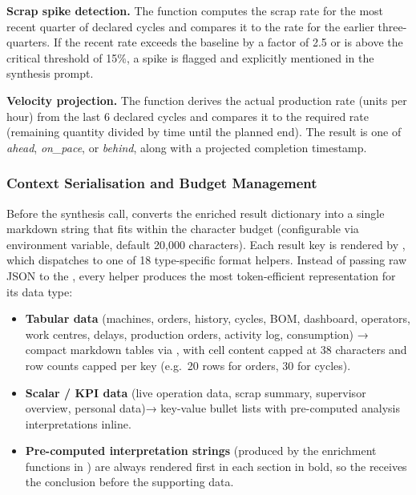 \textbf{Scrap spike detection.} The  function computes
the scrap rate for the most recent quarter of declared cycles and compares it to
the rate for the earlier three-quarters. If the recent rate exceeds the baseline
by a factor of 2.5 or is above the critical threshold of 15\%, a spike is flagged
and explicitly mentioned in the synthesis prompt.

\textbf{Velocity projection.} The  function derives
the actual production rate (units per hour) from the last 6 declared cycles and
compares it to the required rate (remaining quantity divided by time until the
planned end). The result is one of \textit{ahead}, \textit{on\_pace}, or
\textit{behind}, along with a projected completion timestamp.

\subsubsection*{Context Serialisation and Budget Management}
Before the synthesis  call, 
converts the enriched result dictionary into a single markdown string that
fits within the  character budget
(configurable via environment variable, default 20,000 characters).
Each result key is rendered by , which
dispatches to one of 18 type-specific format helpers. Instead of passing
raw JSON to the , every helper produces the most
token-efficient representation for its data type:
\begin{itemize}[noitemsep, topsep=4pt, leftmargin=*]
  \item \textbf{Tabular data} (machines, orders, history, cycles, BOM,
        dashboard, operators, work centres, delays, production orders,
        activity log, consumption) → compact markdown tables via
        , with cell content capped at 38 characters
        and row counts capped per key (e.g.\ 20 rows for orders, 30 for
        cycles).
  \item \textbf{Scalar / KPI data} (live operation data, scrap summary,
        supervisor overview, personal data)→ key-value bullet lists
        with pre-computed analysis interpretations inline.
  \item \textbf{Pre-computed interpretation strings} (produced by the
        enrichment functions in ) are always
        rendered first in each section in bold, so the 
        receives the conclusion before the supporting data.
\end{itemize}
